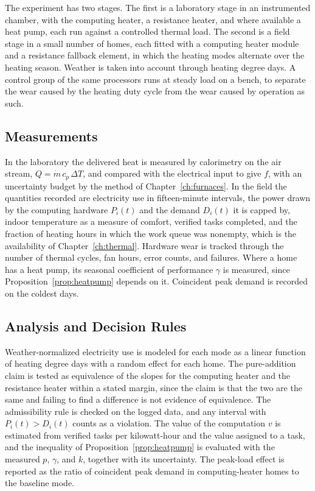 The experiment has two stages. The first is a laboratory stage in an instrumented chamber, with the computing heater, a resistance heater, and where available a heat pump, each run against a controlled thermal load. The second is a field stage in a small number of homes, each fitted with a computing heater module and a resistance fallback element, in which the heating modes alternate over the heating season. Weather is taken into account through heating degree days. A control group of the same processors runs at steady load on a bench, to separate the wear caused by the heating duty cycle from the wear caused by operation as such.

\subsection*{Measurements}

In the laboratory the delivered heat is measured by calorimetry on the air stream, $Q=\dot m\,c_p\,\Delta T$, and compared with the electrical input to give $f$, with an uncertainty budget by the method of Chapter~\ref{ch:furnaces}. In the field the quantities recorded are electricity use in fifteen-minute intervals, the power drawn by the computing hardware $P_i(t)$ and the demand $D_i(t)$ it is capped by, indoor temperature as a measure of comfort, verified tasks completed, and the fraction of heating hours in which the work queue was nonempty, which is the availability of Chapter~\ref{ch:thermal}. Hardware wear is tracked through the number of thermal cycles, fan hours, error counts, and failures. Where a home has a heat pump, its seasonal coefficient of performance $\gamma$ is measured, since Proposition~\ref{prop:heatpump} depends on it. Coincident peak demand is recorded on the coldest days.

\subsection*{Analysis and Decision Rules}

Weather-normalized electricity use is modeled for each mode as a linear function of heating degree days with a random effect for each home. The pure-addition claim is tested as equivalence of the slopes for the computing heater and the resistance heater within a stated margin, since the claim is that the two are the same and failing to find a difference is not evidence of equivalence. The admissibility rule is checked on the logged data, and any interval with $P_i(t)>D_i(t)$ counts as a violation. The value of the computation $v$ is estimated from verified tasks per kilowatt-hour and the value assigned to a task, and the inequality of Proposition~\ref{prop:heatpump} is evaluated with the measured $p$, $\gamma$, and $k$, together with its uncertainty. The peak-load effect is reported as the ratio of coincident peak demand in computing-heater homes to the baseline mode.

